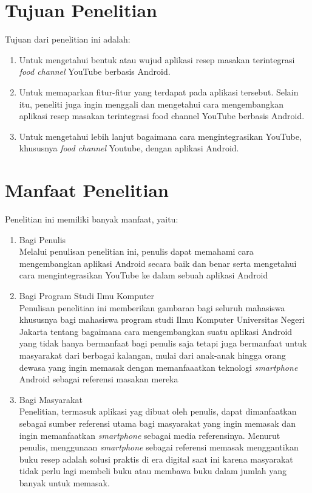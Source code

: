 \section{Tujuan Penelitian}
Tujuan dari penelitian ini adalah: 
\begin{enumerate}
	\item Untuk mengetahui bentuk atau wujud aplikasi resep masakan terintegrasi \emph{food channel} YouTube berbasis Android. 
	\item Untuk memaparkan fitur-fitur yang terdapat pada aplikasi tersebut. Selain itu, peneliti juga ingin menggali dan mengetahui cara mengembangkan aplikasi resep masakan terintegrasi food channel YouTube berbasis Android. 
	\item Untuk mengetahui lebih lanjut bagaimana cara mengintegrasikan YouTube, khususnya \emph{food channel} Youtube, dengan aplikasi Android. 
\end{enumerate}

\section{Manfaat Penelitian}
Penelitian ini memiliki banyak manfaat, yaitu: 
	\begin{enumerate}
		\item Bagi Penulis\\
		Melalui penulisan penelitian ini, penulis dapat memahami cara mengembangkan aplikasi Android secara baik dan benar serta mengetahui cara mengintegrasikan YouTube ke dalam sebuah aplikasi Android
		\item Bagi Program Studi Ilmu Komputer\\
		Penulisan penelitian ini memberikan gambaran bagi seluruh mahasiswa khususnya bagi mahasiswa program studi Ilmu Komputer Universitas Negeri Jakarta tentang bagaimana cara mengembangkan suatu aplikasi Android yang tidak hanya bermanfaat bagi penulis saja tetapi juga bermanfaat untuk masyarakat dari berbagai kalangan, mulai dari anak-anak hingga orang dewasa yang ingin memasak dengan memanfaaatkan teknologi \emph{smartphone} Android sebagai referensi masakan mereka  
		\item Bagi Masyarakat\\
		Penelitian, termasuk aplikasi yag dibuat oleh penulis, dapat dimanfaatkan sebagai sumber referensi utama bagi masyarakat yang ingin memasak dan ingin memanfaatkan \emph{smartphone} sebagai media referensinya.  Menurut penulis, menggunaan \emph{smartphone} sebagai referensi memasak menggantikan buku resep adalah solusi praktis di era digital saat ini karena masyarakat tidak perlu lagi membeli buku atau membawa buku dalam jumlah yang banyak untuk memasak.		
	\end{enumerate}

